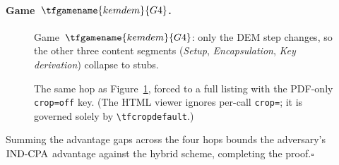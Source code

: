 \documentclass{article}
\begin{document}
\paragraph{Game~$\tfgamename{kemdem}{G4}$.}


\begin{figure}[ht]
\centering
{}
\caption{Game~$\tfgamename{kemdem}{G4}$: only the DEM step changes, so the other
three content segments (\emph{Setup}, \emph{Encapsulation}, \emph{Key
derivation}) collapse to stubs.}
\label{fig:G4}
\end{figure}

\begin{figure}[ht]
\centering
{}
\caption{The same hop as Figure~\ref{fig:G4}, forced to a full listing with the
PDF-only \texttt{crop=off} key. (The HTML viewer ignores per-call
\texttt{crop=}; it is governed solely by \texttt{\textbackslash tfcropdefault}.)}
\label{fig:G4-full}
\end{figure}

\noindent
Summing the advantage gaps across the four hops bounds the adversary's
$\mathrm{IND\text{-}CPA}$ advantage against the hybrid scheme, completing the proof.\hfill$\square$
\end{document}
